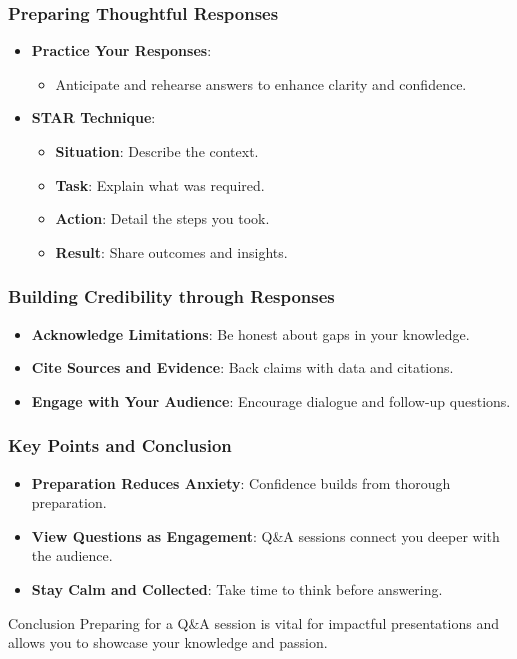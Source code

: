 \documentclass[aspectratio=169]{beamer}
\begin{document}
\begin{frame}[fragile]
    \frametitle{Preparing Thoughtful Responses}
    \begin{itemize}
        \item \textbf{Practice Your Responses}:
        \begin{itemize}
            \item Anticipate and rehearse answers to enhance clarity and confidence.
        \end{itemize}
        \item \textbf{STAR Technique}:
        \begin{itemize}
            \item \textbf{Situation}: Describe the context.
            \item \textbf{Task}: Explain what was required.
            \item \textbf{Action}: Detail the steps you took.
            \item \textbf{Result}: Share outcomes and insights.
        \end{itemize}
    \end{itemize}
\end{frame}

\begin{frame}[fragile]
    \frametitle{Building Credibility through Responses}
    \begin{itemize}
        \item \textbf{Acknowledge Limitations}: Be honest about gaps in your knowledge.
        \item \textbf{Cite Sources and Evidence}: Back claims with data and citations.
        \item \textbf{Engage with Your Audience}: Encourage dialogue and follow-up questions.
    \end{itemize}
\end{frame}

\begin{frame}[fragile]
    \frametitle{Key Points and Conclusion}
    \begin{itemize}
        \item \textbf{Preparation Reduces Anxiety}: Confidence builds from thorough preparation.
        \item \textbf{View Questions as Engagement}: Q\&A sessions connect you deeper with the audience.
        \item \textbf{Stay Calm and Collected}: Take time to think before answering.
    \end{itemize}
    \begin{block}{Conclusion}
        Preparing for a Q\&A session is vital for impactful presentations and allows you to showcase your knowledge and passion.
    \end{block}
\end{frame}
\end{document}
